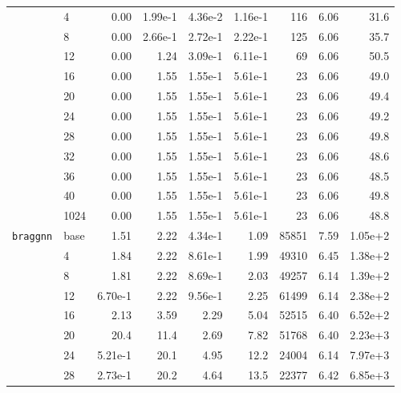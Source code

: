 \begin{longtable}{llrrrrrrr}
\cmidrule{2-9}
         & 4    &   0.00 & 1.99e-1 & 4.36e-2 & 1.16e-1 &     116 &     6.06 & 31.6 \\
\cmidrule{2-9}
         & 8    &   0.00 & 2.66e-1 & 2.72e-1 & 2.22e-1 &     125 &     6.06 & 35.7 \\
\cmidrule{2-9}
         & 12   &   0.00 & 1.24 & 3.09e-1 & 6.11e-1 &      69 &     6.06 & 50.5 \\
\cmidrule{2-9}
         & 16   &   0.00 & 1.55 & 1.55e-1 & 5.61e-1 &      23 &     6.06 & 49.0 \\
\cmidrule{2-9}
         & 20   &   0.00 & 1.55 & 1.55e-1 & 5.61e-1 &      23 &     6.06 & 49.4 \\
\cmidrule{2-9}
         & 24   &   0.00 & 1.55 & 1.55e-1 & 5.61e-1 &      23 &     6.06 & 49.2 \\
\cmidrule{2-9}
         & 28   &   0.00 & 1.55 & 1.55e-1 & 5.61e-1 &      23 &     6.06 & 49.8 \\
\cmidrule{2-9}
         & 32   &   0.00 & 1.55 & 1.55e-1 & 5.61e-1 &      23 &     6.06 & 48.6 \\
\cmidrule{2-9}
         & 36   &   0.00 & 1.55 & 1.55e-1 & 5.61e-1 &      23 &     6.06 & 48.5 \\
\cmidrule{2-9}
         & 40   &   0.00 & 1.55 & 1.55e-1 & 5.61e-1 &      23 &     6.06 & 49.8 \\
\cmidrule{2-9}
         & 1024 &   0.00 & 1.55 & 1.55e-1 & 5.61e-1 &      23 &     6.06 & 48.8 \\
\midrule
\texttt{braggnn} & base &   1.51 & 2.22 & 4.34e-1 & 1.09 &   85851 &     7.59 & 1.05e+2 \\
\cmidrule{2-9}
         & 4    &   1.84 & 2.22 & 8.61e-1 & 1.99 &   49310 &     6.45 & 1.38e+2 \\
\cmidrule{2-9}
         & 8    &   1.81 & 2.22 & 8.69e-1 & 2.03 &   49257 &     6.14 & 1.39e+2 \\
\cmidrule{2-9}
         & 12   &   6.70e-1 & 2.22 & 9.56e-1 & 2.25 &   61499 &     6.14 & 2.38e+2 \\
\cmidrule{2-9}
         & 16   &   2.13 & 3.59 & 2.29 & 5.04 &   52515 &     6.40 & 6.52e+2 \\
\cmidrule{2-9}
         & 20   &   20.4 & 11.4 & 2.69 & 7.82 &   51768 &     6.40 & 2.23e+3 \\
\cmidrule{2-9}
         & 24   &   5.21e-1 & 20.1 & 4.95 & 12.2 &   24004 &     6.14 & 7.97e+3 \\
\cmidrule{2-9}
         & 28   &   2.73e-1 & 20.2 & 4.64 & 13.5 &   22377 &     6.42 & 6.85e+3 \\

\end{longtable}
